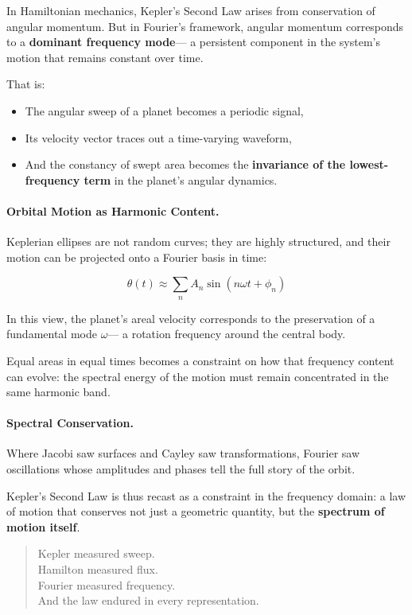 In Hamiltonian mechanics, Kepler’s Second Law arises from conservation of angular momentum.  
But in Fourier’s framework, angular momentum corresponds to a \textbf{dominant frequency mode}—  
a persistent component in the system’s motion that remains constant over time.

That is:

\begin{itemize}
  \item The angular sweep of a planet becomes a periodic signal,
  \item Its velocity vector traces out a time-varying waveform,
  \item And the constancy of swept area becomes the \textbf{invariance of the lowest-frequency term} in the planet’s angular dynamics.
\end{itemize}

\bigskip

\paragraph{Orbital Motion as Harmonic Content.}

Keplerian ellipses are not random curves; they are highly structured,  
and their motion can be projected onto a Fourier basis in time:

\[
\theta(t) \approx \sum_{n} A_n \sin(n\omega t + \phi_n)
\]

In this view, the planet’s areal velocity corresponds to the preservation of a fundamental mode \( \omega \)—  
a rotation frequency around the central body.

Equal areas in equal times becomes a constraint on how that frequency content can evolve:  
the spectral energy of the motion must remain concentrated in the same harmonic band.

\bigskip

\paragraph{Spectral Conservation.}

Where Jacobi saw surfaces and Cayley saw transformations,  
Fourier saw oscillations whose amplitudes and phases tell the full story of the orbit.

Kepler’s Second Law is thus recast as a constraint in the frequency domain:  
a law of motion that conserves not just a geometric quantity,  
but the \textbf{spectrum of motion itself}.

\bigskip

\begin{quote}
Kepler measured sweep.\\
Hamilton measured flux.\\
Fourier measured frequency.\\
And the law endured in every representation.
\end{quote}